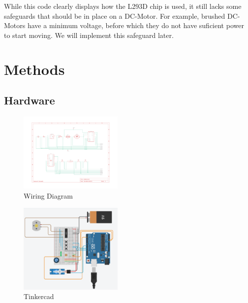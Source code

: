 \documentclass[journal]{IEEEtran}
\begin{document}
While this code clearly displays how the L293D chip is used, it still lacks some safeguards that should be in
place on a DC-Motor. For example, brushed DC-Motors have a minimum voltage, before which they do not have
suficient power to start moving. We will implement this safeguard later.

\vfill\null
\pagebreak

\section{Methods}
\subsection{Hardware}

\begin{figure}[H]%
    \begin {center}
    \includegraphics[width=0.45\textwidth, trim={0 2cm 0 2cm}]{images/wiring-diagram.pdf}
    \caption{Wiring Diagram}
    \label{fig:wiring}
    \end {center}
\end{figure}

\begin{figure}[H]%
    \begin {center}
    \includegraphics[width=0.45\textwidth]{images/tinkercad.PNG}
    \caption{Tinkercad}
    \label{fig:tinkercad}
    \end {center}
\end{figure}
\end{document}
